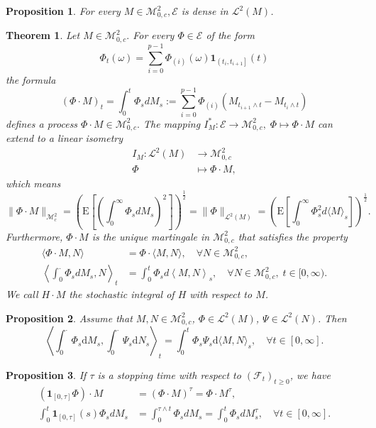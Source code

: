 \documentclass{article}
\newtheorem{proposition}{Proposition}[section]
\newtheorem{theorem}{Theorem}[section]
\theoremstyle{nonumberplain}
\begin{document}
\begin{proposition}
For every $M \in \mathscr{M}^2_{0,c}, \mathscr{E}$ is dense in $\mathscr{L}^{2}(M)$.
\end{proposition}

\begin{theorem}
Let $M \in \mathscr{M}^2_{0,c} .$ For every $\Phi \in \mathscr{E}$ of the form
\[
\Phi_{t}(\omega)=\sum_{i=0}^{p-1} \Phi_{(i)}(\omega) \mathbf{1}_{\left(t_{i}, t_{i+1}\right]}(t)
\]
the formula
\[
(\Phi \cdot M)_{t}=\int_{0}^{t}\Phi_sdM_s:=\sum_{i=0}^{p-1} \Phi_{(i)}\left(M_{t_{i+1} \wedge t}-M_{t_{i} \wedge t}\right)
\]
defines a process $\Phi \cdot M \in \mathscr{M}^2_{0,c}.$ The mapping $I_M^*:\mathscr{E}\to\mathscr{M}^2_{0,c},\;\Phi \mapsto \Phi \cdot M$ can extend to a linear isometry
\begin{align*}
I_M:\mathscr{L}^{2}(M)&\longrightarrow\mathscr{M}^2_{0,c}\\
\Phi &\longmapsto \Phi \cdot M,
\end{align*}
which means
\[
\|\Phi \cdot M\|_{\mathscr{M}^2_c}=\left(\mathrm{E}\left[\left(\int_{0}^{\infty}\Phi_sdM_s\right)^2\right]\right)^{\tfrac{1}{2}}=\|\Phi\|_{\mathscr{L}^2(M)}=\left(\mathrm{E}\left[\int_{0}^{\infty} \Phi_{s}^{2} d\langle M\rangle_{s}\right]\right)^{\tfrac{1}{2}}.
\]
Furthermore, $\Phi \cdot M$ is the unique martingale in $\mathscr{M}^2_{0,c}$ that satisfies the property
\begin{align*}
\langle \Phi \cdot M, N\rangle&= \Phi \cdot\langle M, N\rangle, \quad \forall N \in\mathscr{M}^2_{0,c},\\
\left\langle \int_{0}^{\cdot}\Phi_sdM_s, N\right\rangle_t&= \int_{0}^{t}\Phi_sd\left\langle M, N\right\rangle_s, \quad \forall N \in\mathscr{M}^2_{0,c},\;t\in[0,\infty).
\end{align*}
We call $H \cdot M$ the stochastic integral of $H$ with respect to $M$.
\end{theorem}

\begin{proposition}
	Assume that $M,N\in\mathscr{M}^2_{0,c}$, $\Phi\in\mathscr{L}^2(M)$, $\Psi\in\mathscr{L}^2(N)$. Then
	\[
	\left\langle\int_{0}^\cdot \Phi_{s} \mathrm{d} M_{s}, \int_{0}^\cdot \Psi_{s} \mathrm{d} N_{s}\right\rangle_{t}=\int_{0}^{t} \Phi_{s}\Psi_{s} \mathrm{d}\langle M, N\rangle_{s},\quad\forall t\in[0,\infty].
	\]
\end{proposition}

\begin{proposition}
If $\tau$ is a stopping time with respect to $(\mathcal{F}_t)_{t\ge0}$, we have
\begin{align*}
\left(\mathbf{1}_{[0, \tau]} \Phi\right) \cdot M&=(\Phi \cdot M)^{\tau}=\Phi \cdot M^{\tau},\\
\int_{0}^{t}\mathbf{1}_{[0, \tau]}(s)\Phi_sdM_s&=\int_{0}^{\tau\wedge t}\Phi_sdM_s=\int_{0}^{ t}\Phi_sdM_s^{\tau},\quad\forall t\in[0,\infty].
\end{align*}
\end{proposition}
\end{document}

